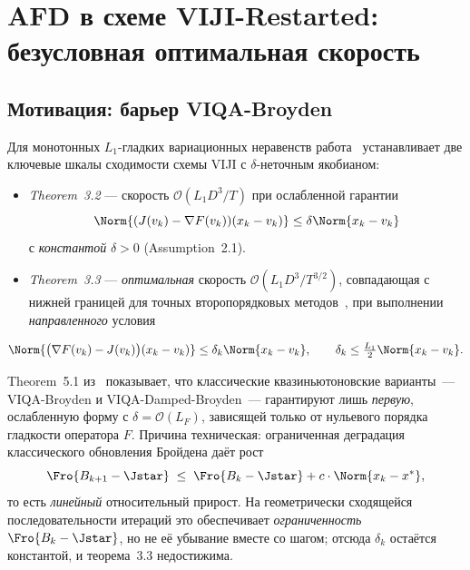 
\chapter{AFD в схеме VIJI-Restarted:
         безусловная оптимальная скорость}
\label{ch:afd}

\section{Мотивация: барьер VIQA-Broyden}
\label{sec:viji:motivation}

Для монотонных $L_1$-гладких вариационных неравенств работа~\cite{Agafonov2024VIJI}
устанавливает две ключевые шкалы сходимости схемы VIJI с $\delta$-неточным
якобианом:

\begin{itemize}
\item \emph{Theorem~3.2} --- скорость $\mathcal O(L_1 D^3 / T)$ при ослабленной
      гарантии
      $$\Norm{(J(v_k) - \nabla F(v_k))(x_k - v_k)} \le \delta\Norm{x_k - v_k}$$
      с \emph{константой} $\delta > 0$ (Assumption~2.1).
\item \emph{Theorem~3.3} --- \emph{оптимальная} скорость
      $\mathcal O(L_1 D^3 / T^{3/2})$, совпадающая с нижней границей для
      точных второпорядковых методов~\cite{Lin2022Perseus}, при выполнении
      \emph{направленного} условия
\end{itemize}

\begin{equation}
\Norm{\big(\nabla F(v_k) - J(v_k)\big)(x_k - v_k)} \le \delta_k \Norm{x_k - v_k},
\qquad \delta_k \le \tfrac{L_1}{2}\Norm{x_k - v_k}.
\label{eq:cond14}
\end{equation}

Theorem~5.1 из~\cite{Agafonov2024VIJI} показывает, что классические
квазиньютоновские варианты~--- VIQA-Broyden и VIQA-Damped-Broyden~---
гарантируют лишь \emph{первую}, ослабленную форму с $\delta = \mathcal O(L_F)$,
зависящей только от нульевого порядка гладкости оператора $F$. Причина
техническая: ограниченная деградация классического обновления Бройдена
даёт рост
\begin{equation}
\Fro{B_{k+1} - \Jstar} \;\le\; \Fro{B_k - \Jstar} + c\cdot\Norm{x_k - x^{*}},
\label{eq:br-bd}
\end{equation}
то есть \emph{линейный} относительный прирост. На геометрически сходящейся
последовательности итераций это обеспечивает \emph{ограниченность}
$\Fro{B_k - \Jstar}$, но не её убывание вместе со шагом; отсюда $\delta_k$
остаётся константой, и теорема~3.3 недостижима.


